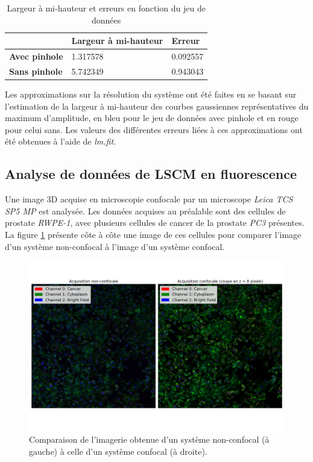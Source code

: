 \documentclass[11pt,letterpaper]{article}
\begin{document}
\begin{table}[H]
\centering
\begin{tabular}{|p{3.2cm}|p{4.2cm}|p{3.2cm}|}
\cline{2-3}
\multicolumn{1}{c|}{} & \textbf{Largeur à mi-hauteur} & \textbf{Erreur} \\
\hline
\textbf{Avec pinhole} & 1.317578 & 0.092557 \\
\hline
\textbf{Sans pinhole} & 5.742349 & 0.943043 \\
\hline
\end{tabular}
\caption{Largeur à mi-hauteur et erreurs en fonction du jeu de données}
\label{FMWH}
\end{table}

Les approximations sur la résolution du système ont été faites en se basant sur l'estimation de la largeur à mi-hauteur des courbes gaussiennes représentatives du maximum d'amplitude, en bleu pour le jeu de données avec pinhole et en rouge pour celui sans. Les valeurs des différentes erreurs liées à ces approximations ont été obtenues à l'aide de \textit{lm.fit}.

\subsection{Analyse de données de LSCM en fluorescence}

Une image 3D acquise en microscopie confocale par un microscope \textit{Leica TCS SP5 MP} est analysée. Les données
acquises au préalable sont des cellules de prostate \textit{RWPE-1}, avec plusieurs cellules de cancer de la prostate
\textit{PC3} présentes. La figure \ref{non_yes_confo} présente côte à côte une image de ces cellules pour comparer
l'image d'un système non-confocal à l'image d'un système confocal.

\begin{figure}[H]
  \centering
  \includegraphics[scale=0.45]{non_and_yes_confocal.png}
  \caption{Comparaison de l'imagerie obtenue d'un système non-confocal (à gauche) à celle d'un système confocal (à droite).}
  \label{non_yes_confo}
\end{figure}
\end{document}
